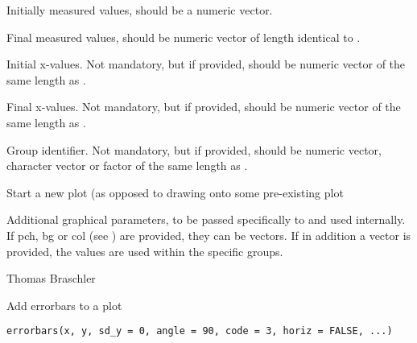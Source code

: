 \documentclass[a4paper]{book}
\begin{document}
\begin{Arguments}
\begin{ldescription}
\item[\code{y\_initial}] 
Initially measured values, should be a numeric vector.

\item[\code{y\_final}] 
Final measured values, should be numeric vector of length identical to .

\item[\code{x\_initial}] 
Initial x-values. Not mandatory, but if provided, should be numeric vector of the same length as .


\item[\code{x\_final}] 
Final x-values. Not mandatory, but if provided, should be numeric vector of the same length as .

\item[\code{groups}] 
Group identifier. Not mandatory, but if provided, should be numeric vector, character vector or factor of the same length as .

\item[\code{plot.new}] Start a new plot (as opposed to drawing onto some pre-existing plot





\item[\code{...}] 
Additional graphical parameters, to be passed specifically to  and  used internally. If pch, bg or col (see ) are provided, they can be vectors. If in addition a  vector is provided, the values are used within the specific groups. 

\end{ldescription}
\end{Arguments}
%
\begin{Author}\relax
Thomas Braschler
\end{Author}
%
\begin{Description}\relax
Add errorbars to a plot
\end{Description}
%
\begin{Usage}
\begin{verbatim}
errorbars(x, y, sd_y = 0, angle = 90, code = 3, horiz = FALSE, ...)
\end{verbatim}
\end{Usage}
%
\end{document}
